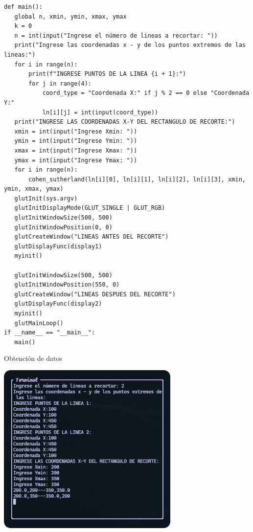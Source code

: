 \documentclass[a4paper]{article}
\begin{document}
\begin{center}
\begin{mycodebox}
\begin{lstlisting}
def main():
   global n, xmin, ymin, xmax, ymax
   k = 0
   n = int(input("Ingrese el número de lineas a recortar: "))
   print("Ingrese las coordenadas x - y de los puntos extremos de las lineas:")
   for i in range(n):
       print(f"INGRESE PUNTOS DE LA LINEA {i + 1}:")
       for j in range(4):
           coord_type = "Coordenada X:" if j % 2 == 0 else "Coordenada Y:"
           ln[i][j] = int(input(coord_type))
   print("INGRESE LAS COORDENADAS X-Y DEL RECTANGULO DE RECORTE:")
   xmin = int(input("Ingrese Xmin: "))
   ymin = int(input("Ingrese Ymin: "))
   xmax = int(input("Ingrese Xmax: "))
   ymax = int(input("Ingrese Ymax: "))
   for i in range(n):
       cohen_sutherland(ln[i][0], ln[i][1], ln[i][2], ln[i][3], xmin, ymin, xmax, ymax)
   glutInit(sys.argv)
   glutInitDisplayMode(GLUT_SINGLE | GLUT_RGB)
   glutInitWindowSize(500, 500)
   glutInitWindowPosition(0, 0)
   glutCreateWindow("LINEAS ANTES DEL RECORTE")
   glutDisplayFunc(display1)
   myinit()

   glutInitWindowSize(500, 500)
   glutInitWindowPosition(550, 0)
   glutCreateWindow("LINEAS DESPUES DEL RECORTE")
   glutDisplayFunc(display2)
   myinit()
   glutMainLoop()
if __name__ == "__main__":
   main()
\end{lstlisting}
\end{mycodebox}
\end{center}

Obtención de datos 
\begin{center}
\includegraphics[width=9cm]{src/terminal1.png}
\end{center}
\end{document}
